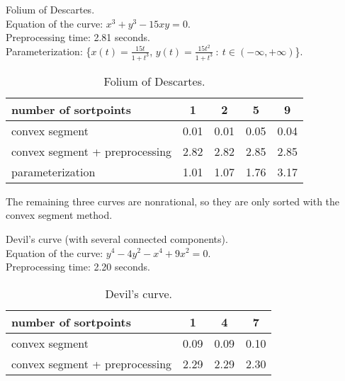 \begin{example}
\label{eg-folium}
{\samepage
Folium of Descartes.\\
\indent Equation of the curve: $x^{3} + y^{3} - 15xy = 0$.\\
\indent Preprocessing time: 2.81 seconds.\\
\indent Parameterization: \{$x(t) = \frac{15t}{1+t^{3}}$, $y(t) = 
\frac{15t^{2}}{1+t^{3}}\ :\ t \in (-\infty, +\infty)$\}.

}
\begin{table}[htbp]
\caption{Folium of Descartes.}
\begin{center}
\begin{tabular}{|l|c|c|c|c|} \hline
number of sortpoints & 1 & 2 & 5 & 9 \\ \hline \hline
convex segment &           0.01 & 0.01 & 0.05 & 0.04 \\ \hline
convex segment + preprocessing & 2.82 & 2.82 & 2.85 & 2.85 \\ \hline
parameterization & 1.01 & 1.07 & 1.76 & 3.17 \\ \hline
\end{tabular}
\end{center}
\end{table}
\end{example}

The remaining three curves are nonrational, so they are only 
sorted with the convex segment method.

\vspace{.2in}

\begin{example}
\label{eg-devil}
{\samepage
Devil's curve (with several connected components).\\
\indent Equation of the curve: $y^{4} - 4y^{2} - x^{4} + 9x^{2} = 0$.\\
\indent Preprocessing time: 2.20 seconds.

}
\clearpage

\begin{table}[htbp]
\caption{Devil's curve.}
\begin{center}
\begin{tabular}{|l|c|c|c|} \hline
number of sortpoints & 1 & 4 & 7 \\ \hline \hline
convex segment & 0.09 & 0.09 & 0.10 \\ \hline
convex segment + preprocessing & 2.29 & 2.29 & 2.30 \\ \hline
\end{tabular}
\end{center}
\end{table}
\end{example}

